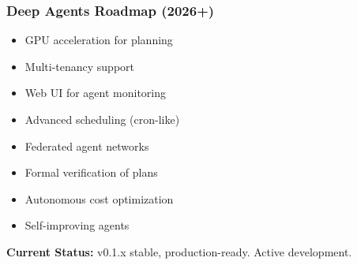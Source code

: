 \documentclass[aspectratio=169,11pt]{beamer}
\begin{document}
\begin{frame}[fragile]
\frametitle{Deep Agents Roadmap (2026+)}

\begin{conceptbox}[Q2 2026 Planned]
\begin{itemize}
    \setlength{\itemsep}{1pt}
  \item GPU acceleration for planning
  \item Multi-tenancy support
  \item Web UI for agent monitoring
  \item Advanced scheduling (cron-like)
\end{itemize}
\end{conceptbox}

\begin{conceptbox}[Beyond]
\begin{itemize}
    \setlength{\itemsep}{1pt}
  \item Federated agent networks
  \item Formal verification of plans
  \item Autonomous cost optimization
  \item Self-improving agents
\end{itemize}
\end{conceptbox}

\vspace{1em}
\textcolor{lcblue}{\textbf{Current Status:}} v0.1.x stable, production-ready. Active development.

\end{frame}
\end{document}
